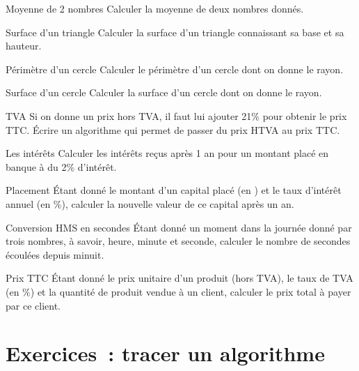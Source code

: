 \begin{Exercice}{Moyenne de 2 nombres}	
	Calculer la moyenne de deux nombres donnés.
\end{Exercice}

\begin{Exercice}{Surface d’un triangle}
	Calculer la surface d’un triangle 
	connaissant sa base et sa hauteur.
\end{Exercice}

\begin{Exercice}{Périmètre d’un cercle}
	Calculer le périmètre d’un cercle dont on donne le rayon. 
\end{Exercice}

\begin{Exercice}{Surface d’un cercle}
	Calculer la surface d’un cercle dont on donne le rayon. 
\end{Exercice}

\begin{Exercice}{TVA}
	Si on donne un prix hors TVA, il faut lui ajouter 21\% 
	pour obtenir le prix TTC. Écrire un algorithme qui permet 
	de passer du prix HTVA au prix TTC.
\end{Exercice}

\begin{Exercice}{Les intérêts}	
	Calculer les intérêts reçus après 1 an 
	pour un montant placé en banque à du 2\% d’intérêt.
\end{Exercice}

\begin{Exercice}{Placement}
	Étant donné le montant d’un capital placé (en \texteuro) 
	et le taux d’intérêt annuel (en \%), calculer la
	nouvelle valeur de ce capital après un an.
\end{Exercice}

\begin{Exercice}{Conversion HMS en secondes}
	Étant donné un moment dans la journée donné
	par trois nombres, à savoir, heure, minute et seconde, calculer le
	nombre de secondes écoulées depuis minuit.
\end{Exercice}

\begin{Exercice}{Prix TTC}
	Étant donné le prix unitaire d’un produit
	(hors TVA), le taux de TVA (en \%) 
	et la quantité de produit vendue à un client, 
	calculer le prix total à payer par ce client.
\end{Exercice}



\section{Exercices~: tracer un algorithme}


